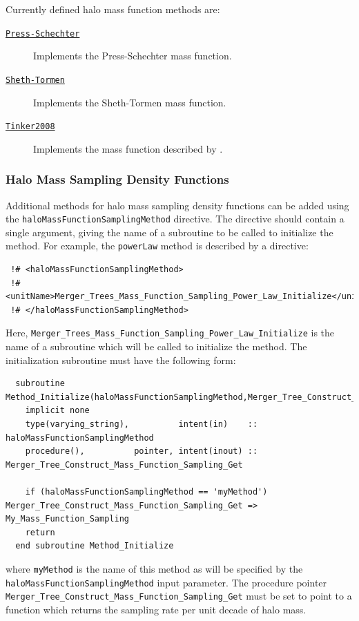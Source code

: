 Currently defined halo mass function methods are:
\begin{description}
 \item [\hyperlink{structure_formation.CDM.halo_mass_function.Press-Schechter.F90:halo_mass_function_press_schechter:halo_mass_function_differential_press_schechter}{{\tt Press-Schechter}}] Implements the Press-Schechter \citep{press_formation_1974} mass function.
 \item [\hyperlink{structure_formation.CDM.halo_mass_function.Sheth-Tormen.F90:halo_mass_function_sheth_tormen:halo_mass_function_sheth_tormen_differential}{{\tt Sheth-Tormen}}] Implements the Sheth-Tormen \citep{sheth_ellipsoidal_2001} mass function.
 \item [\hyperlink{structure_formation.CDM.halo_mass_function.Tinker2008.F90:halo_mass_function_tinker2008:halo_mass_function_differential_tinker2008}{{\tt Tinker2008}}] Implements the mass function described by \cite{tinker_towardhalo_2008}.
\end{description}

\subsubsection{Halo Mass Sampling Density Functions}

Additional methods for halo mass sampling density functions can be added using the {\tt haloMassFunctionSamplingMethod} directive. The directive should contain a single argument, giving the name of a subroutine to be called to initialize the method. For example, the {\tt powerLaw} method is described by a directive:
\begin{verbatim}
 !# <haloMassFunctionSamplingMethod>
 !#  <unitName>Merger_Trees_Mass_Function_Sampling_Power_Law_Initialize</unitName>
 !# </haloMassFunctionSamplingMethod>
\end{verbatim}
Here, {\tt Merger\_Trees\_Mass\_Function\_Sampling\_Power\_Law\_Initialize} is the name of a subroutine which will be called to initialize the method. The initialization subroutine must have the following form:
\begin{verbatim}
  subroutine Method_Initialize(haloMassFunctionSamplingMethod,Merger_Tree_Construct_Mass_Function_Sampling_Get)
    implicit none
    type(varying_string),          intent(in)    :: haloMassFunctionSamplingMethod
    procedure(),          pointer, intent(inout) :: Merger_Tree_Construct_Mass_Function_Sampling_Get
    
    if (haloMassFunctionSamplingMethod == 'myMethod') Merger_Tree_Construct_Mass_Function_Sampling_Get => My_Mass_Function_Sampling
    return
  end subroutine Method_Initialize
\end{verbatim}
where {\tt myMethod} is the name of this method as will be specified by the {\tt haloMassFunctionSamplingMethod} input parameter. The procedure pointer {\tt Merger\_Tree\_Construct\_Mass\_Function\_Sampling\_Get} must be set to point to a function which returns the sampling rate per unit decade of halo mass.

